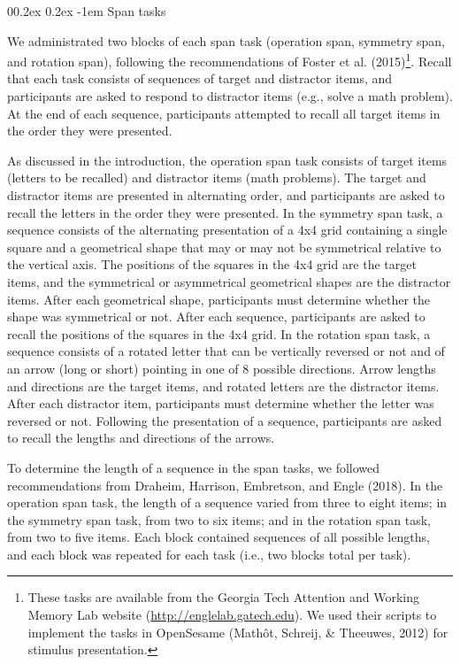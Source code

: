 \documentclass[
  man,floatsintext]{apa6}
\makeatletter
\let\oldparagraph\paragraph
\renewcommand{\paragraph}[1]{\oldparagraph{#1}\mbox{}}
\renewcommand{\paragraph}{\@startsection{paragraph}{4}{\parindent}%
  {0\baselineskip \@plus 0.2ex \@minus 0.2ex}%
  {-1em}%
  {\normalfont\normalsize\bfseries\itshape\typesectitle}}
\makeatother
\begin{document}
\hypertarget{span-tasks}{%
\paragraph{Span tasks}\label{span-tasks}}

We administrated two blocks of each span task (operation span, symmetry span, and rotation span), following the recommendations of Foster et al. (2015)\footnote{These tasks are available from the Georgia Tech Attention and Working Memory Lab website (\url{http://englelab.gatech.edu}). We used their scripts to implement the tasks in OpenSesame (Mathôt, Schreij, \& Theeuwes, 2012) for stimulus presentation.}. Recall that each task consists of sequences of target and distractor items, and participants are asked to respond to distractor items (e.g., solve a math problem). At the end of each sequence, participants attempted to recall all target items in the order they were presented.

As discussed in the introduction, the operation span task consists of target items (letters to be recalled) and distractor items (math problems). The target and distractor items are presented in alternating order, and participants are asked to recall the letters in the order they were presented. In the symmetry span task, a sequence consists of the alternating presentation of a 4x4 grid containing a single square and a geometrical shape that may or may not be symmetrical relative to the vertical axis. The positions of the squares in the 4x4 grid are the target items, and the symmetrical or asymmetrical geometrical shapes are the distractor items. After each geometrical shape, participants must determine whether the shape was symmetrical or not. After each sequence, participants are asked to recall the positions of the squares in the 4x4 grid. In the rotation span task, a sequence consists of a rotated letter that can be vertically reversed or not and of an arrow (long or short) pointing in one of 8 possible directions. Arrow lengths and directions are the target items, and rotated letters are the distractor items. After each distractor item, participants must determine whether the letter was reversed or not. Following the presentation of a sequence, participants are asked to recall the lengths and directions of the arrows.

To determine the length of a sequence in the span tasks, we followed recommendations from Draheim, Harrison, Embretson, and Engle (2018). In the operation span task, the length of a sequence varied from three to eight items; in the symmetry span task, from two to six items; and in the rotation span task, from two to five items. Each block contained sequences of all possible lengths, and each block was repeated for each task (i.e., two blocks total per task).
\end{document}
